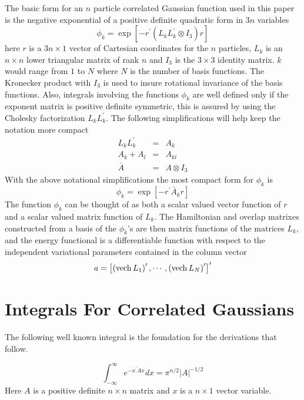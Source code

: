 \documentclass[12pt,thmsa,suthesis,verbatim]{report}
\begin{document}
The basic form for an $n$ particle correlated Gaussian function used in this
paper is the negative exponential of a positive definite quadratic form in $%
3n$ variables 
\begin{equation}
\phi _k=\exp \left[ -r^{\prime }\left( L_kL_k^{\prime }\otimes I_3\right)
r\right]
\end{equation}
here $r$ is a $3n\times 1$ vector of Cartesian coordinates for the $n$
particles, $L_k$ is an $n\times n$ lower triangular matrix of rank $n$ and $%
I_3$ is the $3\times 3$ identity matrix. $k$ would range from $1$ to $N$
where $N$ is the number of basis functions. The Kronecker product with $I_3$
is used to insure rotational invariance of the basis functions. Also,
integrals involving the functions $\phi _k$ are well defined only if the
exponent matrix is positive definite symmetric, this is assured by using the
Cholesky factorization $L_kL_k^{\prime }$. The following simplifications
will help keep the notation more compact 
\begin{eqnarray}
L_kL_k^{\prime } &=&A_k \\
A_k+A_l &=&A_{kl} \\
\bar A &=&A\otimes I_3
\end{eqnarray}
With the above notational simplifications the most compact form for $\phi _k$
is 
\begin{equation}
\phi _k=\exp \left[ -r^{\prime }\bar A_kr\right]
\end{equation}
The function $\phi _k$ can be thought of as both a scalar valued vector
function of $r$ and a scalar valued matrix function of $L_k$. The
Hamiltonian and overlap matrixes constructed from a basis of the $\phi _k$'s
are then matrix functions of the matrices $L_k$, and the energy functional
is a differentiable function with respect to the independent variational
parameters contained in the column vector 
\begin{equation}
a=\left[ \left( \mathrm{vech}\,L_1\right) ^{\prime },\cdots ,\left( \mathrm{%
vech}\,L_N\right) ^{\prime }\right] ^{\prime }  \label{avec}
\end{equation}

\section{Integrals For Correlated Gaussians}

The following well known\cite{Friedman90:int} integral is the foundation for
the derivations that follow.

\begin{equation}
\int_{-\infty }^\infty e^{-x^{\prime }Ax}dx=\pi ^{n/2}\left| A\right| ^{-1/2}
\label{baseint}
\end{equation}
Here $A$ is a positive definite $n\times n$ matrix and $x$ is a $n\times 1$
vector variable.
\end{document}
